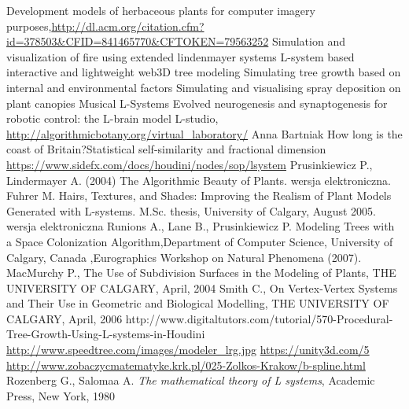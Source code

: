 \documentclass[b5paper,twoside,11pt]{article}
\begin{document}
\begin{thebibliography}{99}
Development models of herbaceous plants for computer imagery purposes,\url{http://dl.acm.org/citation.cfm?id=378503&CFID=841465770&CFTOKEN=79563252}
 Simulation and visualization of fire using extended lindenmayer systems
L-system based interactive and lightweight web3D tree modeling
 Simulating tree growth based on internal and environmental factors
Simulating and visualising spray deposition on plant canopies
Musical L-Systems
Evolved neurogenesis and synaptogenesis for robotic control: the L-brain model
L-studio, \url{http://algorithmicbotany.org/virtual_laboratory/}
Anna Bartniak
How long is the coast of Britain?Statistical self-similarity and fractional dimension 
\url{https://www.sidefx.com/docs/houdini/nodes/sop/lsystem}
Prusinkiewicz P., Lindermayer A. (2004) The Algorithmic Beauty of Plants.  wersja elektroniczna.
Fuhrer M. Hairs, Textures, and Shades: Improving the Realism of Plant Models Generated with L-systems. M.Sc. thesis, University of Calgary, August 2005. wersja elektroniczna
Runions A., Lane B., Prusinkiewicz P. Modeling Trees with a Space Colonization Algorithm,Department of Computer Science, University of Calgary, Canada ,Eurographics Workshop on Natural Phenomena (2007).
 MacMurchy P., The Use of Subdivision Surfaces in the Modeling of Plants, THE UNIVERSITY OF CALGARY, April, 2004
 Smith C., On Vertex-Vertex Systems and Their Use in Geometric and Biological Modelling, THE UNIVERSITY OF CALGARY, April, 2006
http://www.digitaltutors.com/tutorial/570-Procedural-Tree-Growth-Using-L-systems-in-Houdini
\url{http://www.speedtree.com/images/modeler_lrg.jpg}
\url{https://unity3d.com/5}
\url{http://www.zobaczycmatematyke.krk.pl/025-Zolkos-Krakow/b-spline.html}
 Rozenberg G., Salomaa A. \textit{The mathematical theory of L systems}, Academic Press, New York, 1980

\end{thebibliography}

\ifdefined\PROCINCLUDED
%
\else
\end{document}
